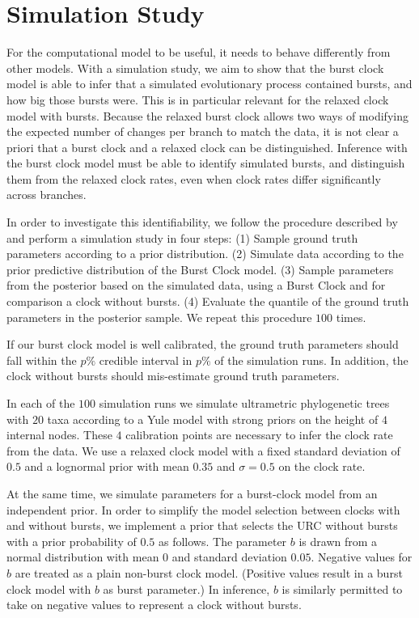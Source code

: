 \documentclass[]{rsos}%
\begin{document}
\section{Simulation Study}
\label{s:simulation}
For the computational model to be useful, it needs to behave differently from
other models. With a simulation study, we aim to show that the burst clock model is able to
infer that a simulated evolutionary process contained bursts, and how big those bursts were.
This is in particular relevant for the relaxed clock model with bursts.
Because the relaxed burst clock allows two ways of modifying the expected number
of changes per branch to match the data, it is not clear a priori that a burst
clock and a relaxed clock can be distinguished.
Inference with the burst clock model must be able to identify simulated bursts, and distinguish them from the relaxed clock rates, even when clock rates differ significantly across branches.

In order to investigate this identifiability,
we follow the procedure described by \textcite{cook2006validation} and perform a simulation study in four steps: (1) Sample ground truth parameters according to a prior distribution. (2) Simulate data according to the prior predictive distribution of the Burst Clock model. (3) Sample parameters from the posterior based on the simulated data, using a Burst Clock and for comparison a clock without bursts. (4) Evaluate the quantile of the ground truth parameters in the posterior sample.
We repeat this procedure $100$ times.

If our burst clock model is well calibrated, the ground truth parameters should fall within the $p\%$ credible interval in $p\%$ of the simulation runs. In addition, the clock without bursts should mis-estimate ground truth parameters.

In each of the $100$ simulation runs we simulate ultrametric phylogenetic trees with $20$ taxa according to a Yule model with strong priors on the height of $4$ internal nodes. These $4$ calibration points are necessary to infer the clock rate from the data. We use a relaxed clock model with a fixed standard deviation of $0.5$ and a lognormal prior with mean $0.35$ and $\sigma = 0.5$ on the clock rate.

At the same time, we simulate parameters for a burst-clock model from an independent prior. In order to simplify the model selection between clocks with and without bursts, we implement a prior that selects the URC without bursts with a prior probability of $0.5$ as follows. The parameter $b$ is drawn from a normal distribution with mean $0$ and standard deviation $0.05$. Negative values for $b$ are treated as a plain non-burst clock model. (Positive values result in a burst clock model with $b$ as burst parameter.) In inference, $b$ is similarly permitted to take on negative values to represent a clock without bursts.
\end{document}
